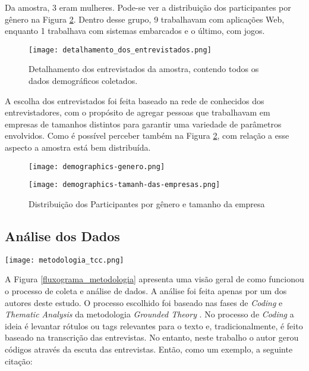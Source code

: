 Da amostra, 3 eram mulheres. Pode-se ver a distribuição dos participantes por gênero na Figura \ref{genero_e_tamanho}. Dentro desse grupo, 9 trabalhavam com aplicações Web, enquanto 1 trabalhava com sistemas embarcados e o último, com jogos.

\begin{figure}[h]
\centering
\texttt{[image: detalhamento\_dos\_entrevistados.png]}
\caption{Detalhamento dos entrevistados da amostra, contendo todos os dados demográficos coletados.}
\label{detalhamento_dos_entrevistados}
\end{figure}


A escolha dos entrevistados foi feita baseado na rede de conhecidos dos entrevistadores, com o propósito de agregar pessoas que trabalhavam em empresas de tamanhos distintos para garantir uma variedade de parâmetros envolvidos. Como é possível perceber também na Figura \ref{genero_e_tamanho}, com relação a esse aspecto a amostra está bem distribuída. 

\begin{figure}
\begin{minipage}{.21\textwidth}
    \centering
    \texttt{[image: demographics-genero.png]}
\end{minipage}%
\begin{minipage}{.25\textwidth}
    \centering
    \texttt{[image: demographics-tamanh-das-empresas.png]}
\end{minipage}
\caption{
    Distribuição dos Participantes por gênero e tamanho da empresa
    }
    \label{genero_e_tamanho}
\end{figure}

\subsection{Análise dos Dados}

\begin{figure*}[ht]
\begin{center}
\texttt{[image: metodologia\_tcc.png]}
\end{center}
\caption[Fluxograma da Metodologia]{
    Visão geral dos processos de coleta e análise de dados.
}\label{fluxograma_metodologia}
\end{figure*}

    
A Figura \ref{fluxograma_metodologia} apresenta uma visão geral de como funcionou o processo de coleta e análise de dados. A análise foi feita apenas por um dos autores deste estudo. O processo escolhido foi baseado nas fases de \emph{Coding} e \emph{Thematic Analysis} da metodologia \emph{Grounded Theory} \cite{groundedTheory}. No processo de \emph{Coding} a ideia é levantar rótulos ou tags relevantes para o texto e, tradicionalmente, é feito baseado na transcrição das entrevistas. No entanto, neste trabalho o autor gerou códigos através da escuta das entrevistas. Então, como um exemplo, a seguinte citação:

